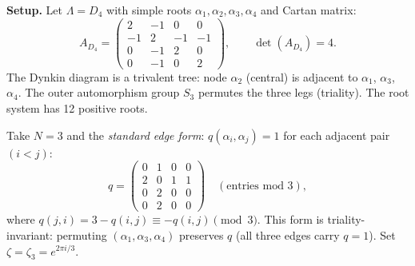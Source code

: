 \begin{computation}[\texorpdfstring{$D_4$}{D_4} at the Coxeter root: \texorpdfstring{$N = 3$}{N = 3}, triality]
\label{comp:lattice:d4-n3}

\noindent\textbf{Setup.}
Let $\Lambda = D_4$ with simple roots $\alpha_1, \alpha_2, \alpha_3,
\alpha_4$ and Cartan matrix:
\[
A_{D_4} =
\begin{pmatrix}
 2 & -1 & 0 & 0 \\
-1 & 2 & -1 & -1 \\
 0 & -1 & 2 & 0 \\
 0 & -1 & 0 & 2
\end{pmatrix},
\qquad
\det(A_{D_4}) = 4.
\]
The Dynkin diagram is a trivalent tree: node $\alpha_2$ (central)
is adjacent to $\alpha_1$, $\alpha_3$, $\alpha_4$. The outer
automorphism group $S_3$ permutes the three legs (triality).
The root system has 12 positive roots.

Take $N = 3$ and the \emph{standard edge form}:
$q(\alpha_i,\alpha_j) = 1$ for each adjacent pair $(i < j)$:
\[
q = \begin{pmatrix}
0 & 1 & 0 & 0 \\
2 & 0 & 1 & 1 \\
0 & 2 & 0 & 0 \\
0 & 2 & 0 & 0
\end{pmatrix}
\quad (\text{entries mod } 3),
\]
where $q(j,i) = 3 - q(i,j) \equiv -q(i,j) \pmod{3}$. This form
is triality-invariant: permuting
$(\alpha_1, \alpha_3, \alpha_4)$ preserves $q$
(all three edges carry $q = 1$).
Set $\zeta = \zeta_3 = e^{2\pi i/3}$.
\smallskip


\end{computation}
